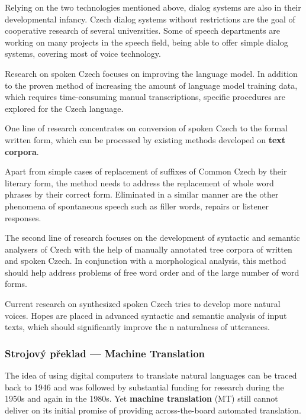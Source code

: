 \documentclass[]{../../metanetpaper}
\begin{document}
\begin{multicols}{2}
Relying on the two technologies mentioned above, dialog systems are also in their developmental infancy. Czech dialog systems without restrictions are the goal of cooperative research of several universities. Some of speech departments are working on many projects in the speech field, being able to offer simple dialog systems, covering most of voice technology.

Research on spoken Czech focuses on improving the language model. In addition to the proven method of increasing the amount of language model training data, which requires time-consuming manual transcriptions, specific procedures are explored for the Czech language.

One line of research concentrates on conversion of spoken Czech to the formal written form, which can be processed by existing methods developed on \textbf{text corpora}.

Apart from simple cases of replacement of suffixes of Common Czech by their literary form, the method needs to address the replacement of whole word phrases by their correct form. Eliminated in a similar manner are the other phenomena of spontaneous speech such as filler words, repairs or listener responses.

The second line of research focuses on the development of syntactic and semantic analysers of Czech with the help of manually annotated tree corpora of written and spoken Czech. In conjunction with a morphological analysis, this method should help address problems of free word order and of the large number of word forms.

Current research on synthesized spoken Czech tries to develop more natural voices. Hopes are placed in advanced syntactic and semantic analysis of input texts, which should significantly improve the n naturalness of utterances.

\subsubsection{Strojový překlad --- Machine Translation}

The idea of using digital computers to translate natural languages can be traced back to 1946 and was followed by substantial funding for research during the 1950s and again in the 1980s. Yet \textbf{machine translation} (MT) still cannot deliver on its initial promise of providing across-the-board automated translation.


\end{multicols}
\end{document}
